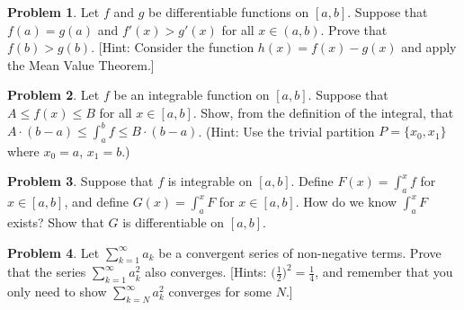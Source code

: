 \documentclass[12pt]{article}
\theoremstyle{definition}
\newtheorem{problem}{Problem}
\newenvironment{answer}{\par\medskip\bgroup\color{darkblue}}{\egroup\par\medskip}
\begin{document}
\begin{problem} %
Let $f$ and $g$ be differentiable functions on $[a,b]$.  Suppose that $f(a)=g(a)$ and $f'(x)>g'(x)$ for all
$x\in(a,b)$.  Prove that $f(b)>g(b)$.  [Hint:  Consider the function $h(x)=f(x)-g(x)$ and apply the Mean
Value Theorem.]
\end{problem}

\begin{answer}
\end{answer}





\begin{problem} %
Let $f$ be an integrable function on $[a,b]$.  Suppose that $A\le f(x) \le B$ for all $x\in [a,b]$.
Show, from the definition of the integral, that $A\cdot (b-a)\le\int_a^b f\le B\cdot (b-a)$.
(Hint: Use the trivial partition $P=\{x_0,x_1\}$ where $x_0=a$, $x_1=b$.)
\end{problem}

\begin{answer}
\end{answer}





\begin{problem} %
Suppose that $f$ is integrable on $[a,b]$.  
Define $F(x)=\int_a^x f$ for $x\in[a,b]$,
and define $G(x)=\int_a^x F$ for $x\in[a,b]$.  How do we know $\int_a^x F$ exists?  Show that
$G$ is differentiable on $[a,b]$.
\end{problem}

\begin{answer}
\end{answer}





\begin{problem} %
Let $\sum_{k=1}^\infty a_k$ be a convergent series of non-negative terms.
Prove that the series $\sum_{k=1}^\infty a_k^2$ also converges.
[Hints: $\big(\frac{1}{2}\big)^2=\frac{1}{4}$, and remember that you only
need to show $\sum_{k=N}^\infty a_k^2$ converges for some $N$.]
\end{problem}

\begin{answer}
\end{answer}
\end{document}
